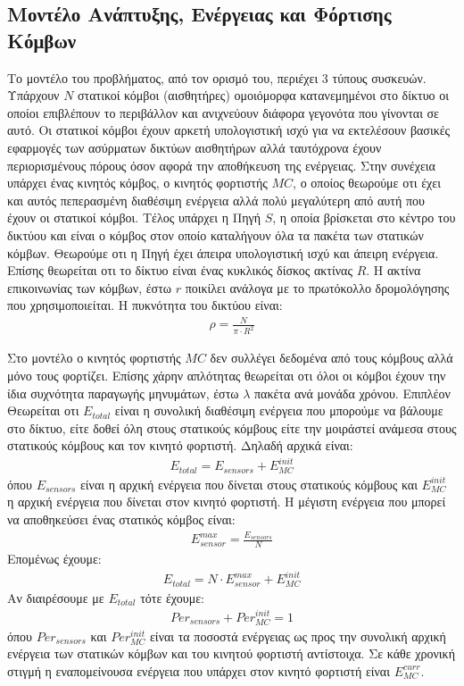 \subsection{Μοντέλο Ανάπτυξης, Ενέργειας και Φόρτισης Κόμβων}
Το μοντέλο του προβλήματος, από τον ορισμό του, περιέχει 3 τύπους συσκευών. Υπάρχουν $N$ στατικοί κόμβοι (αισθητήρες) ομοιόμορφα κατανεμημένοι στο δίκτυο οι
οποίοι επιβλέπουν το περιβάλλον και ανιχνεύουν διάφορα γεγονότα που γίνονται σε αυτό. Οι στατικοί κόμβοι έχουν αρκετή υπολογιστική ισχύ για να εκτελέσουν βασικές
εφαρμογές των ασύρματων δικτύων αισθητήρων αλλά ταυτόχρονα έχουν περιορισμένους πόρους όσον αφορά την αποθήκευση της ενέργειας. Στην συνέχεια υπάρχει ένας κινητός
κόμβος, ο κινητός φορτιστής $MC$, ο οποίος θεωρούμε οτι έχει και αυτός πεπερασμένη διαθέσιμη ενέργεια αλλά πολύ μεγαλύτερη από αυτή που έχουν οι στατικοί κόμβοι.
Τέλος υπάρχει η Πηγή $S$, η οποία βρίσκεται στο κέντρο του δικτύου και είναι ο κόμβος στον οποίο καταλήγουν όλα τα πακέτα των στατικών κόμβων. Θεωρούμε οτι η Πηγή
έχει άπειρα υπολογιστική ισχύ και άπειρη ενέργεια. Επίσης θεωρείται οτι το δίκτυο είναι ένας κυκλικός δίσκος ακτίνας $R$. Η ακτίνα επικοινωνίας των κόμβων, έστω $r$
ποικίλει ανάλογα με το πρωτόκολλο δρομολόγησης που χρησιμοποιείται. Η πυκνότητα του δικτύου είναι:
\begin{align*}
\rho = \frac{N}{\pi\cdot R^{2}}
\end{align*}

Στο μοντέλο ο κινητός φορτιστής $MC$ δεν συλλέγει δεδομένα από τους κόμβους αλλά μόνο τους φορτίζει. Επίσης χάρην απλότητας θεωρείται οτι όλοι οι
κόμβοι έχουν την ίδια συχνότητα παραγωγής μηνυμάτων, έστω $\lambda$ πακέτα ανά μονάδα χρόνου. Επιπλέον Θεωρείται οτι $E_{total}$ είναι η συνολική διαθέσιμη ενέργεια
που μπορούμε να βάλουμε στο δίκτυο, είτε δοθεί όλη στους στατικούς κόμβους είτε την μοιράστεί ανάμεσα στους στατικούς κόμβους και τον κινητό φορτιστή. Δηλαδή
αρχικά είναι:
\begin{align}
\label{total}
E_{total} = E_{sensors} + E_{MC}^{init}
\end{align}
όπου $E_{sensors}$ είναι η αρχική ενέργεια που δίνεται στους στατικούς κόμβους και $E_{MC}^{init}$ η αρχική ενέργεια που δίνεται στον κινητό φορτιστή. Η μέγιστη
ενέργεια που μπορεί να αποθηκεύσει ένας στατικός κόμβος είναι:
\begin{align*}
E^{max}_{sensor} = \frac{E_{sensors}}{N}
\end{align*}
Επομένως έχουμε:
\begin{align*}
E_{total} = N \cdot E^{max}_{sensor} + E_{MC}^{init}
\end{align*}
Αν διαιρέσουμε με $E_{total}$ τότε έχουμε:
\begin{align*}
Per_{sensors} + Per_{MC}^{init} = 1
\end{align*}
όπου $Per_{sensors}$ και $Per_{MC}^{init}$ είναι τα ποσοστά ενέργειας ως προς την συνολική αρχική ενέργεια των στατικών κόμβων και του κινητού φορτιστή αντίστοιχα.
Σε κάθε χρονική στιγμή η εναπομείνουσα ενέργεια που υπάρχει στον κινητό φορτιστή είναι $E^{curr}_{MC}$.

